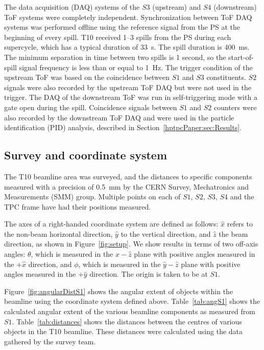 The data acquisition (DAQ) systems of the $\mathit{S3}$ (upstream) and $\mathit{S4}$ (downstream) ToF systems were completely independent.
Synchronization between ToF DAQ systems was performed offline using the reference signal from the PS at the beginning of every spill.
T10 received 1--3 spills from the PS during each supercycle, which has a typical duration of 33~s.
The spill duration is 400~ms.
The minimum separation in time between two spills is 1 second, so the start-of-spill signal frequency is less than or equal to 1~Hz.
The trigger condition of the upstream ToF was based on the coincidence between $\mathit{S1}$ and $\mathit{S3}$ constituents.
$\mathit{S2}$ signals were also recorded by the upstream ToF DAQ but were not used in the trigger.
The DAQ of the downstream ToF was run in self-triggering mode with a gate open during the spill.
Coincidence signals between $\mathit{S1}$ and $\mathit{S2}$ counters were also recorded by the downstream ToF DAQ and were used in the particle identification (PID) analysis, described in Section~\ref{hptpcPaper:sec:Results}.  

\subsection{Survey and coordinate system}
\label{sec:coord}
The T10 beamline area was surveyed, and the distances to specific components measured with a precision of 0.5~mm by the CERN Survey, Mechatronics and Measurements (SMM) group.
Multiple points on each of $\mathit{S1}$, $\mathit{S2}$, $\mathit{S3}$, $\mathit{S4}$ and the TPC frame have had their positions measured.

The axes of a right-handed coordinate system are defined as follows: $\hat{x}$ refers to the non-beam horizontal direction, $\hat{y}$ to the vertical direction, and $\hat{z}$ the beam direction, as shown in Figure~\ref{fig:setup}.
We show results in terms of two off-axis angles: $\theta$, which is measured in the $\hat{x}-\hat{z}$ plane with positive angles measured in the $+\hat{x}$ direction, and $\phi$, which is measured in the $\hat{y}-\hat{z}$ plane with positive angles measured in the $+\hat{y}$ direction.
The origin is taken to be at $\mathit{S1}$.

Figure~\ref{fig:angularDistS1} shows the angular extent of objects within the beamline using the coordinate system defined above.
Table~\ref{tab:angS1} shows the calculated angular extent of the various beamline components as measured from $\mathit{S1}$.
Table~\ref{tab:distances} shows the distances between the centres of various objects in the T10 beamline.
These distances were calculated using the data gathered by the survey team.

